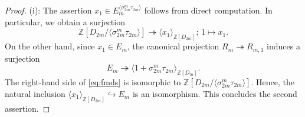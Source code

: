 \documentclass[12pt]{amsart}
\theoremstyle{plain}
\theoremstyle{definition}
\numberwithin{thm}{section}
\numberwithin{equation}{section}
\newcommand{\Z}{\mathbb{Z}}
\begin{document}
\begin{proof}
(i): The assertion $x_{1}\in E_{m}^{\langle \sigma_{2m}^{m}\tau_{2m} \rangle}$ follows from direct computation. In particular, we obtain a surjection
\begin{equation*}
\Z[D_{2m}/\langle \sigma_{2m}^{m}\tau_{2m} \rangle]\twoheadrightarrow \langle x_{1}\rangle_{\Z[D_{2m}]};\,1\mapsto x_{1}. 
\end{equation*}
On the other hand, since $x_{1}\in E_{m}$, the canonical projection $R_{m}\twoheadrightarrow R_{m,1}$ induces a surjection
\begin{equation}\label{eq:fmds}
E_{m}\twoheadrightarrow \langle 1+\sigma_{2m}^{m}\tau_{2m}\rangle_{\Z[D_{m}]}. 
\end{equation}
The right-hand side of \eqref{eq:fmds} is isomorphic to $\Z[D_{2m}/\langle \sigma_{2m}^{m}\tau_{2m}\rangle]$. Hence, the natural inclusion $\langle x_{1}\rangle_{\Z[D_{2m}]}\hookrightarrow E_{m}$ is an isomorphism. This concludes the second assertion. 


\end{proof}
\end{document}
